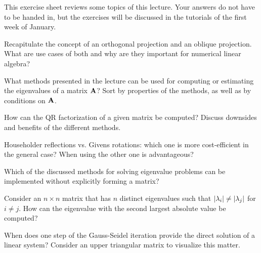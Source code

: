 
\begin{Sheet}
  \label{sheet10}


  This exercise sheet reviews some topics of this lecture. Your
  answers do not have to be handed in, but the exercises will be
  discussed in the tutorials of the first week of January.

  \begin{Problem}
    Recapitulate the concept of an orthogonal projection and an
    oblique projection. What are use cases of both and why are they
    important for numerical linear algebra?
  \end{Problem}

  \begin{Problem}
    What methods presented in the lecture can be used for computing or
    estimating the eigenvalues of a matrix $\mathbf A$? Sort by properties
    of the methods, as well as by conditions on $\mathbf A$.
  \end{Problem}

  \begin{Problem}
    How can the QR factorization of a given matrix be computed?
    Discuss downsides and benefits of the different methods.
  \end{Problem}

  \begin{Problem}
    Householder reflections vs. Givens rotations: which one is more
    cost-efficient in the general case? When using the other one is
    advantageous?
  \end{Problem}

  \begin{Problem}
    Which of the discussed methods for solving eigenvalue problems can
    be implemented without explicitly forming a matrix?
  \end{Problem}

  \begin{Problem}
    Consider an $n\times n$ matrix that has $n$ distinct eigenvalues
    such that $\lvert\lambda_i\rvert \neq \lvert\lambda_j\rvert$ for $i\neq
    j$. How can the eigenvalue with the second largest absolute value
    be computed?
  \end{Problem}

  \begin{Problem}
    When does one step of the Gauss-Seidel iteration provide the
    direct solution of a linear system? Consider an upper triangular
    matrix to visualize this matter.
  \end{Problem}

\end{Sheet}


